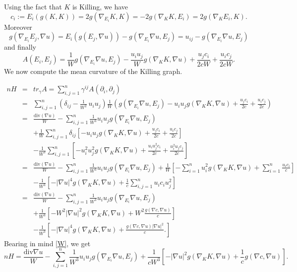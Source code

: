 \documentclass[12pt]{article}
\numberwithin{lemma}{section}
\begin{document}
Using the fact that $K$ is Killing, we have
\[
c_i:=E_i(g(K,K))=2g\left(\nabla_{E_i}K,K\right)=-2g\left(\nabla_KK,{E_i}\right)=2g\left(\nabla_{K}E_i,K\right).
\]
Moreover 
\[g\left(\nabla_{E_i}E_j,\nabla u\right)
=E_i(g(E_j,\nabla u))-g\left(\nabla_{E_i}\nabla u,E_j\right)=u_{ij}-g(\nabla_{E_i}\nabla u,E_j)\]
and finally
\begin{equation}
A\left(E_i,E_j\right)=\frac{1}{W}g\left(\nabla_{E_i}\nabla u,E_j\right)-\frac{u_iu_j}{W}g\left(\nabla_{K} K,\nabla u\right)+\frac{u_jc_i}{2cW}+\frac{u_ic_j}{2cW}.
\end{equation}
We now compute the mean curvature of the Killing graph.

\begin{eqnarray*}
nH&=&tr_{\gamma}A = \sum_{i,j=1}^n \gamma^{ij}A(\partial_i,\partial_j) \\ &=&\sum^{n}_{i,j=1}\left(\delta_{ij}-\frac{1}{W^2}\,u_iu_j\right)\frac{1}{W}\left(g(\nabla_{E_i}\nabla u,E_j)-u_iu_jg\left(\nabla_{K} K,\nabla u\right)+\frac{u_jc_i}{2c}+\frac{u_ic_j}{2c}\right)\\	
&=&\frac{\mathrm{div}(\nabla u)}{W} -\sum^{n}_{i,j=1}\frac{1}{W^3}u_iu_jg\left(\nabla_{E_i}\nabla u,E_j\right)\\ 
&&+\frac{1}{W}\sum^{n}_{i,j=1}\delta_{ij}\left[-u_iu_jg\left(\nabla_{K} K,\nabla u\right)+\frac{u_jc_i}{2c}+\frac{u_ic_j}{2c}\right]\\
&&-\frac{1}{W^3}\sum^{n}_{i,j=1}\left[-u_i^2u_j^2g\left(\nabla_{K} K,\nabla u\right)+\frac{u_iu_j^2c_i}{2c}+\frac{u_i^2u_jc_j}{2c}\right]\\
&=&\frac{\mathrm{div}(\nabla u)}{W} 
-\sum^{n}_{i,j=1}\frac{1}{W^3}u_iu_jg\left(\nabla_{E_i}\nabla u,E_j\right) +\frac{1}{W}\left[-\sum^{n}_{i=1}u_i^2g\left(\nabla_{K} K,\nabla u\right)+\sum^{n}_{i=1}\frac{u_ic_i}{c}\right]\\
&&-\frac{1}{W^3}\left[-|\nabla u|^4
g\left(\nabla_{K} K,\nabla u\right)+\frac{1}{c}\sum^{n}_{i,j=1}u_ic_iu_j^2\right]\\
&=&\frac{\mathrm{div}(\nabla u)}{W} -\sum^{n}_{i,j=1}\frac{1}{W^3}u_iu_jg\left(\nabla_{E_i}\nabla u,E_j\right)\\
&&+\frac{1}{W^3}\left[-W^2|\nabla u|^2g\left(\nabla_{K} K,\nabla u\right)+W^2\frac{g(\nabla c,\nabla u)}{c}\right]\\
&&-\frac{1}{W^3}\left[-|\nabla u|^4g\left(\nabla_{K} K,\nabla u\right)+\frac{g(\nabla c,\nabla u)|\nabla u|^2}{c}.\right]
\end{eqnarray*}
Bearing in mind \eqref{W}, we get 
\[ nH = \frac{\mathrm{div}\nabla u}{W}-\sum^{n}_{i,j=1}\frac{1}{W^3}u_iu_jg(\nabla_{E_i}\nabla u,E_j)+\frac{1}{c W^3}\left[-|\nabla u|^2g\left(\nabla_{K} K,\nabla u\right)+\frac{1}{c}g(\nabla c,\nabla u)\right].
\]
\end{document}
